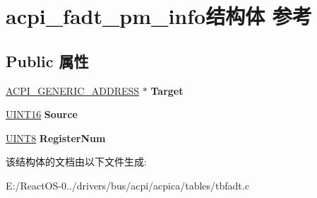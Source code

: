 \hypertarget{structacpi__fadt__pm__info}{}\section{acpi\+\_\+fadt\+\_\+pm\+\_\+info结构体 参考}
\label{structacpi__fadt__pm__info}
\subsection*{Public 属性}
\begin{DoxyCompactItemize}
\item 
\mbox{\label{structacpi__fadt__pm__info_add14f972eefcfd218f4de39c24004f29}} 
\hyperlink{structacpi__generic__address}{A\+C\+P\+I\+\_\+\+G\+E\+N\+E\+R\+I\+C\+\_\+\+A\+D\+D\+R\+E\+SS} $\ast$ {\bfseries Target}
\item 
\mbox{\label{structacpi__fadt__pm__info_a7fce5dca0e2654036c58511b6f8c34a5}} 
\hyperlink{_processor_bind_8h_a09f1a1fb2293e33483cc8d44aefb1eb1}{U\+I\+N\+T16} {\bfseries Source}
\item 
\mbox{\label{structacpi__fadt__pm__info_af455787126b67de063a65819739e4641}} 
\hyperlink{_processor_bind_8h_ab27e9918b538ce9d8ca692479b375b6a}{U\+I\+N\+T8} {\bfseries Register\+Num}
\end{DoxyCompactItemize}


该结构体的文档由以下文件生成\+:\begin{DoxyCompactItemize}
\item 
E\+:/\+React\+O\+S-\/0../drivers/bus/acpi/acpica/tables/tbfadt.\+c\end{DoxyCompactItemize}
